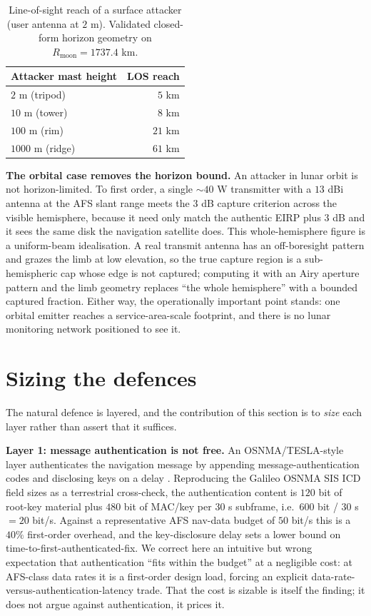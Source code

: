 \documentclass[conference]{IEEEtran}
\begin{document}
\begin{table}[t]
\centering
\caption{Line-of-sight reach of a surface attacker (user antenna at $2$ m).
Validated closed-form horizon geometry on $R_{\mathrm{moon}}=1737.4$ km.}
\label{tab:horizon}
\begin{tabular}{lr}
\toprule
Attacker mast height & LOS reach \\
\midrule
$2$ m (tripod)   & $5$ km  \\
$10$ m (tower)   & $8$ km  \\
$100$ m (rim)    & $21$ km \\
$1000$ m (ridge) & $61$ km \\
\bottomrule
\end{tabular}
\end{table}

\textbf{The orbital case removes the horizon bound.} An attacker in lunar orbit is
not horizon-limited. To first order, a single $\sim$$40$ W transmitter with a $13$
dBi antenna at the AFS slant range meets the $3$ dB capture criterion across the
visible hemisphere, because it need only match the authentic EIRP plus $3$ dB and it
sees the same disk the navigation satellite does. This whole-hemisphere figure is a
uniform-beam idealisation. A real transmit antenna has an off-boresight
pattern and grazes the limb at low elevation, so the true capture region is a
sub-hemispheric cap whose edge is not captured; computing it with an Airy
aperture pattern and the limb geometry replaces ``the whole hemisphere'' with a
bounded captured fraction. Either way, the operationally important point stands: one
orbital emitter reaches a service-area-scale footprint, and there is no lunar
monitoring network positioned to see it.

\section{Sizing the defences}
\label{sec:defence}
The natural defence is layered, and the contribution of this section is to
\emph{size} each layer rather than assert that it suffices.

\textbf{Layer 1: message authentication is not free.} An OSNMA/TESLA-style layer
authenticates the navigation message by appending message-authentication codes and
disclosing keys on a delay \cite{osnma,tesla}. Reproducing the Galileo OSNMA SIS ICD
field sizes \cite{osnmaicd} as a terrestrial cross-check, the authentication content
is $120$ bit of root-key material plus $480$ bit of MAC/key per $30$ s subframe,
i.e.\ $600$ bit / $30$ s $=20$ bit/s. Against a representative AFS nav-data budget of
$50$ bit/s this is a $40\%$ first-order overhead, and the key-disclosure delay sets
a lower bound on time-to-first-authenticated-fix. We correct here an intuitive but
wrong expectation that authentication ``fits within the budget'' at a negligible
cost: at AFS-class data rates it is a first-order design load, forcing an explicit
data-rate-versus-authentication-latency trade. That the cost is sizable is itself
the finding; it does not argue against authentication, it prices it.
\end{document}
